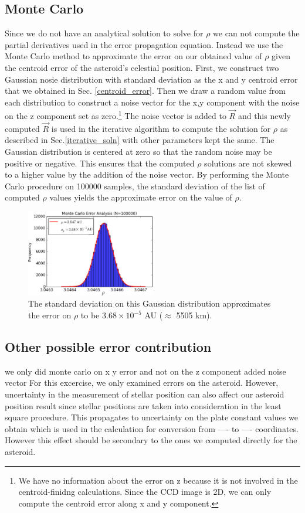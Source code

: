 \documentclass[authoryear, 12pt,5p, times]{elsarticle}
\begin{document}
\subsection{Monte Carlo}
Since we do not have an analytical solution to solve for $\rho$ we can not compute the partial derivatives used in the error propagation equation. Instead we use the Monte Carlo method to approximate the error on our obtained value of $\rho$ given the centroid error of the asteroid's celestial position. First, we construct two Gaussian nosie distribution with standard deviation as the x and y centroid error that we obtained in Sec. \ref{centroid_error}. Then we draw a random value from each distribution to construct a noise vector for the x,y component with the noise on the z component set as zero.\footnote{ We have no information about the error on z  because it is not involved in the centroid-finidng calculations. Since the CCD image is 2D, we can only compute the centroid error along x and y component.}  The noise vector is added to $\vec{R}$ and this newly computed $\vec{R}$ is used in the iterative algorithm to compute the solution for $\rho$ as described in Sec.\ref{iterative_soln} with other parameters kept the same. The Gaussian distribution is centered at zero so that the random noise may be positive or negative. This ensures that the computed $\rho$ solutions are not skewed to  a higher value by the addition of the noise vector. By performing the Monte Carlo procedure on 100000 samples, the standard deviation of the list of computed $\rho$ values yields the approximate error on the value of $\rho$.
    	\begin{figure}[h!]
\includegraphics[width=0.5\textwidth]{figures/monte_carlo_result}
\caption{The standard deviation on this Gaussian distribution approximates the error on $\rho$ to be $3.68\times10^{-5}$ AU ($\approx$ 5505 km).}
\label{monte_carlo_result}
\end{figure}
\subsection{Other possible error contribution}
we only did monte carlo on x y error and not on the z component
added noise vector 
For this excercise, we only examined errors on the asteroid. However, uncertainty in the measurement of stellar position can also affect our asteroid position result since stellar positions are taken into consideration in the least square procedure. This propagates to uncertainty on the plate constant values we obtain which is used in the calculation for conversion from ---- to ---- coordinates. However this effect should be secondary to the ones we computed directly for the asteroid. 
\end{document}
